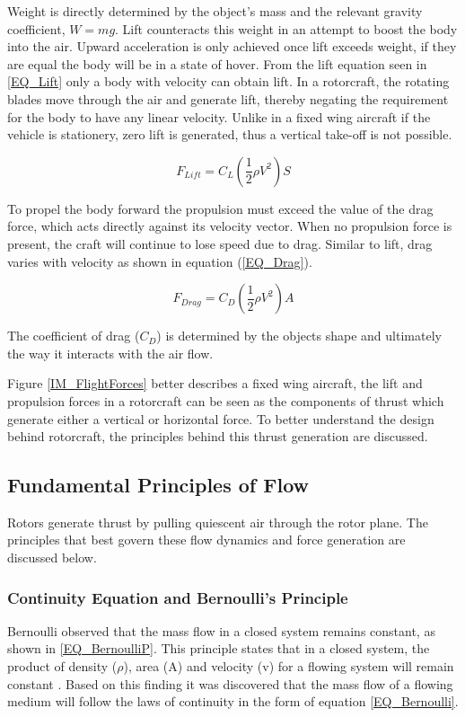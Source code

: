 Weight is directly determined by the object's mass and the relevant gravity coefficient, $W = mg$. Lift counteracts this weight in an attempt to boost the body into the air. Upward acceleration is only achieved once lift exceeds weight, if they are equal the body will be in a state of hover. From the lift equation seen in \eqref{EQ_Lift} only a body with velocity can obtain lift. In a rotorcraft, the rotating blades move through the air and generate lift, thereby negating the requirement for the body to have any linear velocity. Unlike in a fixed wing aircraft if the vehicle is stationery, zero lift is generated, thus a vertical take-off is not possible. 

\begin{equation}
\label{EQ_Lift}
F_{Lift} = C_L(\frac{1}{2} \rho V^2) S
\end{equation}

To propel the body forward the propulsion must exceed the value of the drag force, which acts directly against its velocity vector. When no propulsion force is present, the craft will continue to lose speed due to drag. Similar to lift, drag varies with velocity as shown in equation (\ref{EQ_Drag}).

\begin{equation}
\label{EQ_Drag}
F_{Drag} = C_D (\frac{1}{2} \rho V^2) A
\end{equation}

The coefficient of drag ($C_D$) is determined by the objects shape and ultimately the way it interacts with the air flow. 

Figure \ref{IM_FlightForces} better describes a fixed wing aircraft, the lift and propulsion forces in a rotorcraft can be seen as the components of thrust which generate either a vertical or horizontal force. To better understand the design behind rotorcraft, the principles behind this thrust generation are discussed.

	\subsection{Fundamental Principles of Flow}
	Rotors generate thrust by pulling quiescent air through the rotor plane. The principles that best govern these flow dynamics and force generation are discussed below.
	
		\subsubsection{Continuity Equation and Bernoulli's Principle}
		Bernoulli observed that the mass flow in a closed system remains constant, as shown in \eqref{EQ_BernoulliP}. This principle states that in a closed system, the product of density ($\rho$), area (A) and velocity (v) for a flowing system will remain constant \cite{Dayle}. Based on this finding it was discovered that the mass flow of a flowing medium will follow the laws of continuity in the form of equation \eqref{EQ_Bernoulli}.
		
